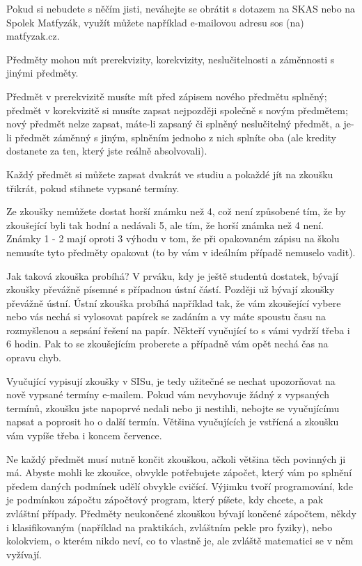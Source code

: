 Pokud si nebudete s něčím jisti, neváhejte se obrátit s dotazem na SKAS nebo na Spolek Matfyzák, využít můžete například e-mailovou adresu sos (na) matfyzak.cz.



Předměty mohou mít prerekvizity, korekvizity, neslučitelnosti a záměnnosti s jinými předměty.

Předmět v prerekvizitě musíte mít před zápisem nového předmětu splněný; předmět v korekvizitě si musíte zapsat nejpozději společně s novým předmětem; nový předmět nelze zapsat, máte-li zapsaný či splněný neslučitelný předmět, a je-li předmět záměnný s jiným, splněním jednoho z nich splníte oba (ale kredity dostanete za ten, který jste reálně absolvovali).




Každý předmět si můžete zapsat dvakrát ve studiu a pokaždé jít na zkoušku třikrát, pokud stihnete vypsané termíny.

Ze zkoušky nemůžete dostat horší známku než 4, což není způsobené tím, že by zkoušející byli tak hodní a nedávali 5, ale tím, že horší známka než 4 není. Známky 1 - 2 mají oproti 3 výhodu v tom, že při opakovaném zápisu na školu nemusíte tyto předměty opakovat (to by vám v ideálním případě nemuselo vadit).

Jak taková zkouška probíhá? V prváku, kdy je ještě studentů dostatek, bývají zkoušky převážně písemné s případnou ústní částí. Později už bývají zkoušky převážně ústní. Ústní zkouška probíhá například tak, že vám zkoušející vybere nebo vás nechá si vylosovat papírek se zadáním a vy máte spoustu času na rozmyšlenou a sepsání řešení na papír. Někteří vyučující to s vámi vydrží třeba i 6 hodin. Pak to se zkoušejícím proberete a případně vám opět nechá čas na opravu chyb.

Vyučující vypisují zkoušky v SISu, je tedy užitečné se nechat upozorňovat na nově vypsané termíny e-mailem. Pokud vám nevyhovuje žádný z vypsaných termínů, zkoušku jste napoprvé nedali nebo ji nestihli, nebojte se vyučujícímu napsat a poprosit ho o další termín. Většina vyučujících je vstřícná a zkoušku vám vypíše třeba i koncem července.

Ne každý předmět musí nutně končit zkouškou, ačkoli většina těch povinných ji má. Abyste mohli ke zkoušce, obvykle potřebujete zápočet, který vám po splnění předem daných podmínek udělí obvykle cvičící. Výjimku tvoří programování, kde je podmínkou zápočtu zápočtový program, který píšete, kdy chcete, a pak zvláštní případy. Předměty neukončené zkouškou bývají končené zápočtem, někdy i klasifikovaným (například na praktikách, zvláštním pekle pro fyziky), nebo kolokviem, o kterém nikdo neví, co to vlastně je, ale zvláště matematici se v něm vyžívají.

